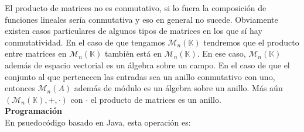 \documentclass[10pt]{article}
\begin{document}
El producto de matrices no es conmutativo, si lo fuera la composición de funciones lineales sería conmutativa y eso en general no sucede. Obviamente existen casos particulares de algunos tipos de matrices en los que sí hay conmutatividad. En el caso de que tengamos $\mathcal{M}_n(\mathbb{K})$ tendremos que el producto entre matrices en $\mathcal{M}_n(\mathbb{K})$ también está en $\mathcal{M}_n(\mathbb{K})$. En ese caso, $\mathcal{M}_n(\mathbb{K})$ además de espacio vectorial es un álgebra sobre un campo. En el caso de que el conjunto al que pertenecen las entradas sea un anillo conmutativo con uno, entonces $\mathcal{M}_n(A)$ además de módulo es un álgebra sobre un anillo. Más aún $(\mathcal{M}_n(\mathbb{K}), +, \cdot)$ con $\cdot$ el producto de matrices es un anillo. \\

\noindent\textbf{Programación} \\

En psuedocódigo basado en Java, esta operación es:
\end{document}
